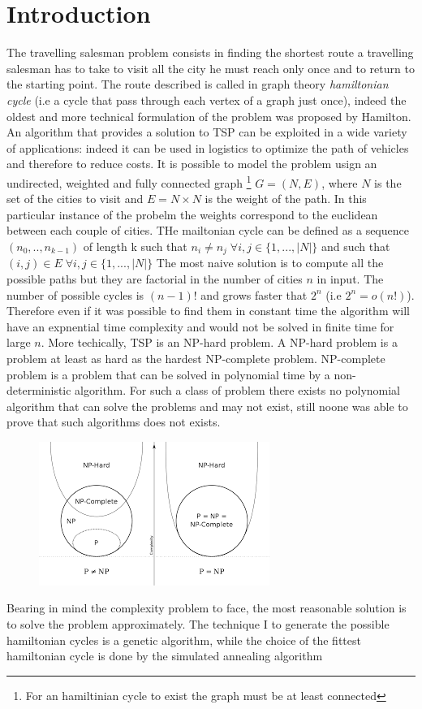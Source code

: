 \documentclass{article}
\begin{document}
\section{Introduction}
The travelling salesman problem consists in finding the shortest route a travelling salesman has to take to visit all the city he must reach only once and to return to the starting point. The route described is called in graph theory \textit{hamiltonian cycle} (i.e a cycle that pass through each vertex of a graph just once), indeed the oldest and more technical formulation of the problem was proposed by Hamilton. \\
An algorithm that provides a solution to TSP can be exploited in a wide variety of applications: indeed it can be used in logistics to optimize the path of vehicles and therefore to reduce costs.
It is possible to model the problem usign an undirected, weighted and fully connected graph \footnote{For an hamiltinian cycle to exist the graph must be at least connected} $G = (N,E)$, where $N$ is the set of the cities to visit and $E =  N \times N$ is the weight of the path. In this particular instance of the probelm the weights correspond to the euclidean between each couple of cities.
THe mailtonian cycle can be defined as a sequence $(n_0, .., n_{k-1})$ of length k such that $n_i \neq n_j \; \forall i,j \in \{1,..., |N|\}$ and such that $(i,j) \in E \; \forall i,j \in \{1,..., |N|\}$
The most naive solution is to compute all the possible paths but they are factorial in the number of cities $n$ in input. The number of possible cycles is $(n-1)!$ and grows faster that $2^n$ (i.e $2^n = o(n!)$). Therefore even if it was possible to find them in constant time the algorithm will have an expnential time complexity and would not be solved in finite time for large $n$. 
More techically, TSP is an NP-hard problem. A NP-hard problem is a problem at least as hard as the hardest NP-complete problem. NP-complete problem is a problem that can be solved in polynomial time by a non-deterministic algorithm. For such a class of problem there exists no polynomial algorithm that can solve the problems and may not exist, still noone was able to prove that such algorithms does not exists.
\begin{figure}
\includegraphics[scale=1]{complexity_classes.png} 
\centering
\end{figure}
Bearing in mind the complexity problem to face, the most reasonable solution is to solve the problem approximately. The technique I to generate the possible hamiltonian cycles is a genetic algorithm, while the choice of the fittest hamiltonian cycle is done by the simulated annealing algorithm
\end{document}
